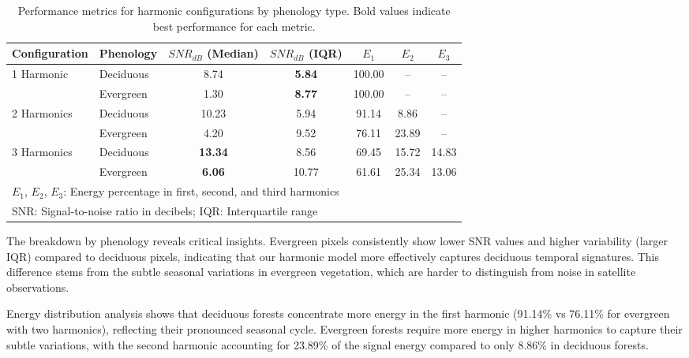 \documentclass[utf8]{FrontiersinHarvard}
\begin{document}
\begin{table}[H]
    \centering
    \begin{tabular}{llccccc}
        \hline
        Configuration & Phenology & $SNR_{dB}$ (Median) & $SNR_{dB}$ (IQR) & $E_1$ & $E_2$ & $E_3$ \\
        \hline
        \multirow{2}{*}{1 Harmonic} 
            & Deciduous & 8.74 & \textbf{5.84} & 100.00 & -- & -- \\
            & Evergreen & 1.30 & \textbf{8.77} & 100.00 & -- & -- \\
        \hline
        \multirow{2}{*}{2 Harmonics} 
            & Deciduous & 10.23 & 5.94 & 91.14 & 8.86 & -- \\
            & Evergreen & 4.20 & 9.52 & 76.11 & 23.89 & -- \\
        \hline
        \multirow{2}{*}{3 Harmonics} 
            & Deciduous & \textbf{13.34} & 8.56 & 69.45 & 15.72 & 14.83 \\
            & Evergreen & \textbf{6.06} & 10.77 & 61.61 & 25.34 & 13.06 \\
        \hline
        \multicolumn{7}{l}{\small $E_1$, $E_2$, $E_3$: Energy percentage in first, second, and third harmonics} \\
        \multicolumn{7}{l}{\small SNR: Signal-to-noise ratio in decibels; IQR: Interquartile range} \\
    \end{tabular}
    \caption{Performance metrics for harmonic configurations by phenology type. Bold values indicate best performance for each metric.}
    \label{tab:harmonic_performance}
\end{table}

The breakdown by phenology reveals critical insights. Evergreen pixels consistently show lower SNR values and higher variability (larger IQR) compared to deciduous pixels, indicating that our harmonic model more effectively captures deciduous temporal signatures. This difference stems from the subtle seasonal variations in evergreen vegetation, which are harder to distinguish from noise in satellite observations.

Energy distribution analysis shows that deciduous forests concentrate more energy in the first harmonic (91.14\% vs 76.11\% for evergreen with two harmonics), reflecting their pronounced seasonal cycle. Evergreen forests require more energy in higher harmonics to capture their subtle variations, with the second harmonic accounting for 23.89\% of the signal energy compared to only 8.86\% in deciduous forests.
\end{document}

